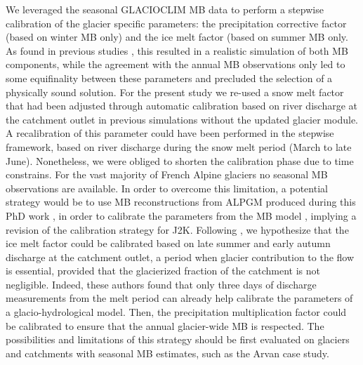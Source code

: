 We leveraged the seasonal GLACIOCLIM MB data to perform a stepwise calibration of the glacier specific parameters: the precipitation corrective factor (based on winter MB only) and the ice melt factor (based on summer MB only. As found in previous studies \citep{schaefli2011MassBalance}, this resulted in a realistic simulation of both MB components, while the agreement with the annual MB observations only led to some equifinality between these parameters and precluded the selection of a physically sound solution. For the present study we re-used a snow melt factor that had been adjusted through automatic calibration based on river discharge at the catchment outlet in previous simulations without the updated glacier module. A recalibration of this parameter could have been performed in the stepwise framework, based on river discharge during the snow melt period (March to late June). Nonetheless, we were obliged to shorten the calibration phase due to time constrains. For the vast majority of French Alpine glaciers no seasonal MB observations are available. In order to overcome this limitation, a potential strategy would be to use MB reconstructions from ALPGM produced during this PhD work \citep{bolibar_deep_2020-3}, in order to calibrate the parameters from the MB model \citep{stahlEA2008}, implying a revision of the calibration strategy for J2K. Following \citet{KonzSeibert2010}, we hypothesize that the ice melt factor could be calibrated based on late summer and early autumn discharge at the catchment outlet, a period when glacier contribution to the flow is essential, provided that the glacierized fraction of the catchment is not negligible. Indeed, these authors found that only three days of discharge measurements from the melt period can already help calibrate the parameters of a glacio-hydrological model. Then, the precipitation multiplication factor could be calibrated to ensure that the annual glacier-wide MB is respected. The possibilities and limitations of this strategy should be first evaluated on glaciers and catchments with seasonal MB estimates, such as the Arvan case study. 

